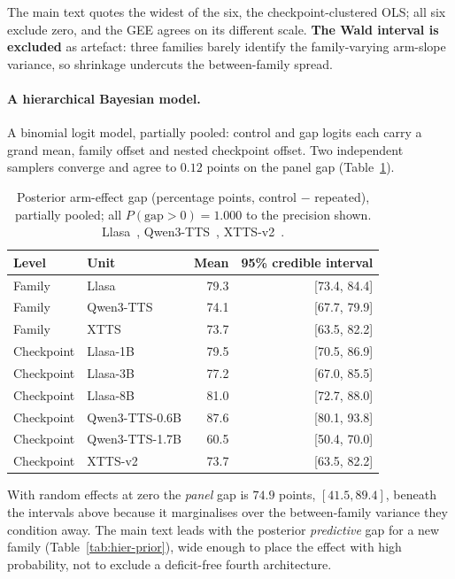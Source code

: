 The main text quotes the widest of the six, the checkpoint-clustered OLS; all six exclude zero,
and the GEE agrees on its different scale. \textbf{The Wald interval is excluded} as artefact:
three families barely identify the family-varying arm-slope variance, so shrinkage undercuts
the between-family spread.

\paragraph{A hierarchical Bayesian model.} A binomial logit model, partially pooled: control
and gap logits each carry a grand mean, family offset and nested checkpoint offset. Two
independent samplers converge and agree to $0.12$ points on the panel gap
(Table~\ref{tab:hier-bayes}).

\begin{table}[htbp]
\centering
\caption{Posterior arm-effect gap (percentage points, control $-$ repeated),
partially pooled; all $P(\mathrm{gap}>0)=1.000$ to the precision shown.
Llasa~\cite{ye2025llasa}, Qwen3-TTS~\cite{hu2026qwen3tts},
XTTS-v2~\cite{casanova2024xtts}.}
\label{tab:hier-bayes}
\small
\begin{tabular}{@{}llrr@{}}
\toprule
Level & Unit & Mean & 95\% credible interval \\
\midrule
Family & Llasa      & 79.3 & [73.4, 84.4] \\
Family & Qwen3-TTS  & 74.1 & [67.7, 79.9] \\
Family & XTTS       & 73.7 & [63.5, 82.2] \\
\addlinespace
Checkpoint & Llasa-1B & 79.5 & [70.5, 86.9] \\
Checkpoint & Llasa-3B & 77.2 & [67.0, 85.5] \\
Checkpoint & Llasa-8B & 81.0 & [72.7, 88.0] \\
Checkpoint & Qwen3-TTS-0.6B & 87.6 & [80.1, 93.8] \\
Checkpoint & Qwen3-TTS-1.7B & 60.5 & [50.4, 70.0] \\
Checkpoint & XTTS-v2 & 73.7 & [63.5, 82.2] \\
\bottomrule
\end{tabular}
\end{table}

With random effects at zero the \emph{panel} gap is $74.9$ points, $[41.5, 89.4]$, beneath the
intervals above because it marginalises over the between-family variance they condition away.
The main text leads with the posterior \emph{predictive} gap for a new family
(Table~\ref{tab:hier-prior}), wide enough to place the effect with high probability, not to
exclude a deficit-free fourth architecture.

